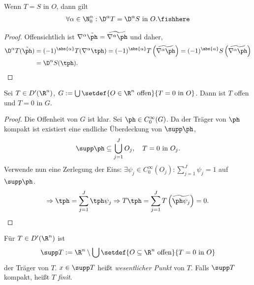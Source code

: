 \begin{prop}
\label{prop:3.22}
Wenn $T=S$ in $O$, dann gilt
\begin{align*}
\forall \alpha\in\N_0^n : \D^\alpha T = \D^\alpha
S \text{ in }O.\fishhere
\end{align*}
\end{prop}
\begin{proof}
Offensichtlich ist $\nabla^\alpha \tilde{\ph} = \widetilde{\nabla^\alpha \ph}$
und daher,
\begin{align*}
\D^\alpha T(\tilde{\ph}) &= (-1)^{\abs{\alpha}} T(\nabla^\alpha\tph) =
(-1)^{\abs{\alpha}} T\left(\widetilde{\nabla^\alpha \ph} \right) =
(-1)^{\abs{\alpha}} S\left(\widetilde{\nabla^\alpha \ph} \right) \\ &= \D^\alpha
S(\tph).\qedhere
\end{align*}
\end{proof}

\begin{prop}
\label{prop:3.23}
Sei $T\in D'(\R^n)$, $G:= \bigcup\setdef{O\in\R^n\text{ offen}}{T = 0\text{
in } O}$. Dann ist $T$ offen und $T=0$ in $G$.\fishhere
\end{prop}
\begin{proof}
Die Offenheit von $G$ ist klar. Sei $\ph\in C_0^\infty(G)$. Da der Träger von
$\ph$ kompakt ist existiert eine endliche Überdeckung von $\supp\ph$,
\begin{align*}
\supp\ph \subseteq \bigcup\limits_{j=1}^J O_j,\quad T=0\text{ in }O_j.
\end{align*}
Verwende nun eine Zerlegung der Eins: $\exists \psi_j \in C_0^\infty(O_j) :
\sum\limits_{j=1}^J \psi_j = 1$ auf $\supp\ph$.
\begin{align*}
\Rightarrow \tph = \sum\limits_{j=1}^J \tph\psi_j \Rightarrow
T\tph = \sum\limits_{j=1}^J T\left(\widetilde{\ph\psi_j}\right) = 0.\qedhere
\end{align*}
\end{proof}

\begin{defn}
\label{defn:3.24}
Für $T\in D'(\R^n)$ ist
\begin{align*}
\supp T:= \R^n\setminus \bigcup \setdef{O\subseteq
\R^n\text{ offen}}{T=0\text{ in }O}
\end{align*}
der Träger von $T$. $x\in \supp T$ heißt \emph{wesentlicher Punkt} von $T$.
Falls $\supp T$ kompakt, heißt $T$ \emph{finit}.\fishhere
\end{defn}

